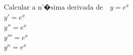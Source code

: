 \begin{ex}
\begin{align}
&\text{Calcular a n'�sima derivada de}\quad y=e^{x}\nonumber\\
&y'=e^{x}\nonumber\\
&y''=e^{x}\nonumber\\
&y'''=e^{x}\nonumber\\
&y^{n}=e^{x}\nonumber
\end{align}
\end{ex}
